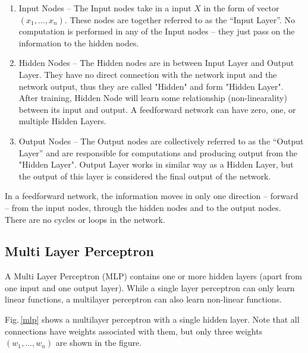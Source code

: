 \begin{enumerate}
\item Input Nodes – The Input nodes take in a input $X$ in the form of vector $(x_1,...,x_n)$. These nodes are together referred to as the “Input Layer”. No computation is performed in any of the Input nodes – they just pass on the information to the hidden nodes.

\item Hidden Nodes – The Hidden nodes are in between Input Layer and Output Layer. They have no direct connection with the network input and the network output, thus they are called "Hidden" and form "Hidden Layer". After training, Hidden Node will learn some relationship (non-linearality) between its input and output. A feedforward network can have zero, one, or multiple Hidden Layers.

\item Output Nodes – The Output nodes are collectively referred to as the “Output Layer” and are responsible for computations and producing output from the "Hidden Layer". Output Layer works in similar way as a Hidden Layer, but the output of this layer is considered the final output of the network.

\end{enumerate}

In a feedforward network, the information moves in only one direction – forward – from the input nodes, through the hidden nodes and to the output nodes. There are no cycles or loops in the network.


\subsection{Multi Layer Perceptron}
A Multi Layer Perceptron (MLP) contains one or more hidden layers (apart from one input and one output layer).  While a single layer perceptron can only learn linear functions, a multilayer perceptron can also learn non-linear functions.

Fig.\,\ref{mlp} shows a multilayer perceptron with a single hidden layer. Note that all connections have weights associated with them, but only three weights $(w_1,...,w_n)$ are shown in the figure.

